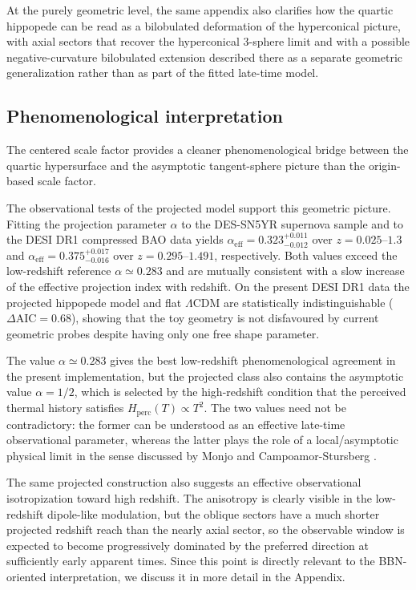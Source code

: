 \documentclass[preprint,12pt]{elsarticle}
\begin{document}
At the purely geometric level, the same appendix also clarifies how the quartic hippopede can be read as a bilobulated deformation of the hyperconical picture, with axial sectors that recover the hyperconical $3$-sphere limit and with a possible negative-curvature bilobulated extension described there as a separate geometric generalization rather than as part of the fitted late-time model.

\subsection{Phenomenological interpretation}

The centered scale factor provides a cleaner phenomenological bridge between the quartic hypersurface and the asymptotic tangent-sphere picture than the origin-based scale factor.

The observational tests of the projected model support this geometric picture. Fitting the projection parameter $\alpha$ to the DES-SN5YR supernova sample and to the DESI DR1 compressed BAO data yields $\alpha_{\mathrm{eff}}=0.323_{-0.012}^{+0.011}$ over $z=0.025$--$1.3$ and $\alpha_{\mathrm{eff}}=0.375_{-0.016}^{+0.017}$ over $z=0.295$--$1.491$, respectively. Both values exceed the low-redshift reference $\alpha\simeq0.283$ and are mutually consistent with a slow increase of the effective projection index with redshift. On the present DESI DR1 data the projected hippopede model and flat $\Lambda$CDM are statistically indistinguishable ($\Delta\mathrm{AIC}=0.68$), showing that the toy geometry is not disfavoured by current geometric probes despite having only one free shape parameter.

The value $\alpha\simeq0.283$ gives the best low-redshift phenomenological agreement in the present implementation, but the projected class also contains the asymptotic value $\alpha=1/2$, which is selected by the high-redshift condition that the perceived thermal history satisfies $H_{\mathrm{perc}}(T)\propto T^2$. The two values need not be contradictory: the former can be understood as an effective late-time observational parameter, whereas the latter plays the role of a local/asymptotic physical limit in the sense discussed by Monjo and Campoamor-Stursberg \cite{monjo2020lagrangian, monjo2023hubble}.

The same projected construction also suggests an effective observational isotropization toward high redshift. The anisotropy is clearly visible in the low-redshift dipole-like modulation, but the oblique sectors have a much shorter projected redshift reach than the nearly axial sector, so the observable window is expected to become progressively dominated by the preferred direction at sufficiently early apparent times. Since this point is directly relevant to the BBN-oriented interpretation, we discuss it in more detail in the Appendix.
\end{document}
